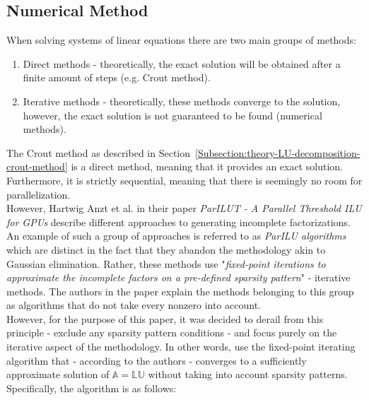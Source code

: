 \subsection{Numerical Method}\label{Subsection:theory-LU-decomposition-numerical-method}
When solving systems of linear equations there are two main groups of methods:

\begin{enumerate}
	\item Direct methods - theoretically, the exact solution will be obtained after a finite amount of steps (e.g. Crout method).
	\item Iterative methods - theoretically, these methods converge to the solution, however, the exact solution is not guaranteed to be found (numerical methods).
\end{enumerate}

The Crout method as described in Section~\ref{Subsection:theory-LU-decomposition-crout-method} is a direct method, meaning that it provides an exact solution. Furthermore, it is strictly sequential, meaning that there is seemingly no room for parallelization. \\
However, Hartwig Anzt et al. in their paper \emph{ParILUT - A Parallel Threshold ILU for GPUs} \cite{Anzt2019} describe different approaches to generating incomplete factorizations. An example of such a group of approaches is referred to as \textit{ParILU algorithms} which are distinct in the fact that they abandon the methodology akin to Gaussian elimination. Rather, these methods use "\textit{fixed-point iterations to approximate the incomplete factors on a pre-defined sparsity pattern}" - iterative methods. The authors in the paper explain the methods belonging to this group as algorithms that do not take every nonzero into account. \\
However, for the purpose of this paper, it was decided to derail from this principle - exclude any sparsity pattern conditions - and focus purely on the iterative aspect of the methodology. In other words, use the fixed-point iterating algorithm that - according to the authors - converges to a sufficiently approximate solution of $ \mathbb{A} = \mathbb{LU} $ without taking into account sparsity patterns. \\
Specifically, the algorithm is as follows:

